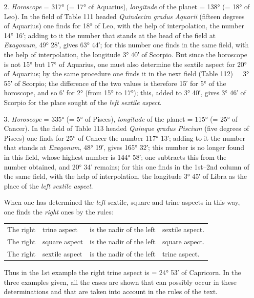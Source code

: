 \documentclass[11pt]{article}
\begin{document}
\par 2. \emph{Horoscope} = 317° (= 17° of Aquarius), \emph{longitude} of the planet = 138° (= 18° of Leo). In the field of Table 111 headed \emph{Quindecim gradus Aquarii} (fifteen degrees of Aquarius) one finds for 18° of Leo, with the help of interpolation, the number 14° 16′; adding to it the number that stands at the head of the field at \emph{Exagonum}, 49° 28′, gives 63° 44′; for this number one finds in the same field, with the help of interpolation, the longitude 3° 40′ of Scorpio. But since the horoscope is not 15° but 17° of Aquarius, one must also determine the sextile aspect for 20° of Aquarius; by the same procedure one finds it in the next field (Table 112) = 3° 55′ of Scorpio; the difference of the two values is therefore 15′ for 5° of the horoscope, and so 6′ for 2° (from 15° to 17°); this, added to 3° 40′, gives 3° 46′ of Scorpio for the place sought of the \emph{left sextile aspect}.\par
\par 3. \emph{Horoscope} = 335° (= 5° of Pisces), \emph{longitude} of the planet = 115° (= 25° of Cancer). In the field of Table 113 headed \emph{Quinque gradus Piscium} (five degrees of Pisces) one finds for 25° of Cancer the number 117° 13′; adding to it the number that stands at \emph{Exagonum}, 48° 19′, gives 165° 32′; this number is no longer found in this field, whose highest number is 144° 58′; one subtracts this from the number obtained, and 20° 34′ remains; for this one finds in the 1st–2nd column of the same field, with the help of interpolation, the longitude 3° 45′ of Libra as the place of the \emph{left sextile aspect}.\par
\par When one has determined the \emph{left} sextile, square and trine aspects in this way, one finds the \emph{right} ones by the rules:\par
\begin{center}\small\begin{tabular}{llll}
The right & trine aspect & is the nadir of the left & sextile aspect. \\
The right & square aspect & is the nadir of the left & square aspect. \\
The right & sextile aspect & is the nadir of the left & trine aspect. \\
\end{tabular}\end{center}
\par Thus in the 1st example the right trine aspect is = 24° 53′ of Capricorn. In the three examples given, all the cases are shown that can possibly occur in these determinations and that are taken into account in the rules of the text.\par
\end{document}
